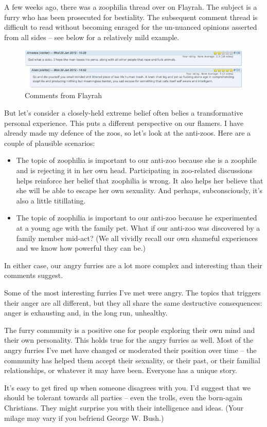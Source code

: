 A few weeks ago, there was a zoophilia thread over on Flayrah. The subject is a furry who has been prosecuted for bestiality. The subsequent comment thread is difficult to read without becoming enraged for the un-nuanced opinions asserted from all sides -- see below for a relatively mild example.

\begin{figure}
  \begin{center}
    \includegraphics[width=\textwidth]{content/assets/born-again--comments}
  \end{center}
  \caption{Comments from Flayrah}
\end{figure}

But let's consider a closely-held extreme belief often belies a transformative personal experience. This puts a different perspective on our flamers. I have already made my defence of the zoos, so let's look at the anti-zoos. Here are a couple of plausible scenarios:

\begin{itemize}
  \item The topic of zoophilia is important to our anti-zoo because she is a zoophile and is rejecting it in her own head. Participating in zoo-related discussions helps reinforce her belief that zoophilia is wrong. It also helps her believe that she will be able to escape her own sexuality. And perhaps, subconsciously, it's also a little titillating.
  \item The topic of zoophilia is important to our anti-zoo because he experimented at a young age with the family pet. What if our anti-zoo was discovered by a family member mid-act? (We all vividly recall our own shameful experiences and we know how powerful they can be.)
\end{itemize}

In either case, our angry furries are a lot more complex and interesting than their comments suggest.

Some of the most interesting furries I've met were angry. The topics that triggers their anger are all different, but they all share the same destructive consequences: anger is exhausting and, in the long run, unhealthy.

The furry community is a positive one for people exploring their own mind and their own personality. This holds true for the angry furries as well. Most of the angry furries I've met have changed or moderated their position over time -- the community has helped them accept their sexuality, or their past, or their familial relationships, or whatever it may have been. Everyone has a unique story.

It's easy to get fired up when someone disagrees with you. I'd suggest that we should be tolerant towards all parties -- even the trolls, even the born-again Christians. They might surprise you with their intelligence and ideas. (Your milage may vary if you befriend George W. Bush.)
